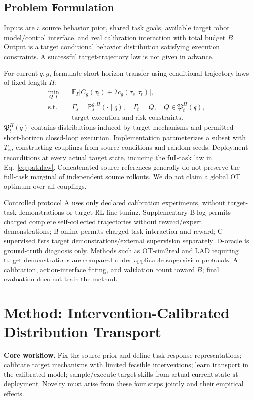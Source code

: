 \documentclass[11pt]{article}
\newcommand{\E}{\mathbb E}
\begin{document}
\subsection{Problem Formulation}
Inputs are a source behavior prior, shared task goals, available target robot model/control interface, and real calibration interaction with total budget $B$. Output is a target conditional behavior distribution satisfying execution constraints. A successful target-trajectory law is not given in advance.

For current $q,g$, formulate short-horizon transfer using conditional trajectory laws of fixed length $H$:
\begin{equation}
 \begin{aligned}
 \min_{Q,\Gamma}\quad&
 \E_{\Gamma}\big[C_g(\tau_t)+\lambda c_g(\tau_s,\tau_t)\big],\\
 \text{s.t.}\quad&\Gamma_s=\mathbb P_s^{g,H}(\cdot\mid q),\quad \Gamma_t=Q,
 \quad Q\in\mathfrak P_t^H(q),\\
 &\text{target execution and risk constraints},
 \end{aligned}
 \label{eq:ideal}
\end{equation}
$\mathfrak P_t^H(q)$ contains distributions induced by target mechanisms and permitted short-horizon closed-loop execution. Implementation parameterizes a subset with $T_\varphi$, constructing couplings from source conditions and random seeds. Deployment reconditions at every actual target state, inducing the full-task law in Eq.~\eqref{eq:pathlaw}. Concatenated source references generally do not preserve the full-task marginal of independent source rollouts. We do not claim a global OT optimum over all couplings.

Controlled protocol A uses only declared calibration experiments, without target-task demonstrations or target RL fine-tuning. Supplementary B-log permits charged complete self-collected trajectories without reward/expert demonstrations; B-online permits charged task interaction and reward; C-supervised lists target demonstrations/external supervision separately; D-oracle is ground-truth diagnosis only. Methods such as OT-sim2real and LAD requiring target demonstrations are compared under applicable supervision protocols. All calibration, action-interface fitting, and validation count toward $B$; final evaluation does not train the method.

\section{Method: Intervention-Calibrated Distribution Transport}
\label{sec:method}
\textbf{Core workflow.} Fix the source prior and define task-response representations; calibrate target mechanisms with limited feasible interventions; learn transport in the calibrated model; sample/execute target skills from actual current state at deployment. Novelty must arise from these four steps jointly and their empirical effects.
\end{document}
